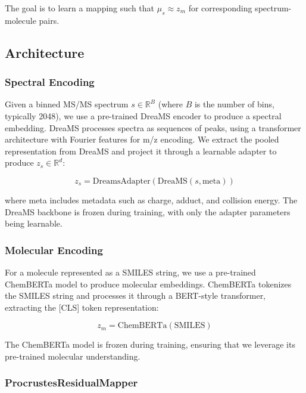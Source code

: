 \documentclass[11pt]{article}
\begin{document}
The goal is to learn a mapping such that $\mu_s \approx z_m$ for corresponding spectrum-molecule pairs.

\subsection{Architecture}

\subsubsection{Spectral Encoding}

Given a binned MS/MS spectrum $s \in \mathbb{R}^{B}$ (where $B$ is the number of bins, typically 2048), we use a pre-trained DreaMS encoder to produce a spectral embedding. DreaMS processes spectra as sequences of peaks, using a transformer architecture with Fourier features for m/z encoding. We extract the pooled representation from DreaMS and project it through a learnable adapter to produce $z_s \in \mathbb{R}^{d}$:

\begin{equation}
z_s = \text{DreamsAdapter}(\text{DreaMS}(s, \text{meta}))
\end{equation}

where meta includes metadata such as charge, adduct, and collision energy. The DreaMS backbone is frozen during training, with only the adapter parameters being learnable.

\subsubsection{Molecular Encoding}

For a molecule represented as a SMILES string, we use a pre-trained ChemBERTa model to produce molecular embeddings. ChemBERTa tokenizes the SMILES string and processes it through a BERT-style transformer, extracting the [CLS] token representation:

\begin{equation}
z_m = \text{ChemBERTa}(\text{SMILES})
\end{equation}

The ChemBERTa model is frozen during training, ensuring that we leverage its pre-trained molecular understanding.

\subsubsection{ProcrustesResidualMapper}
\end{document}
